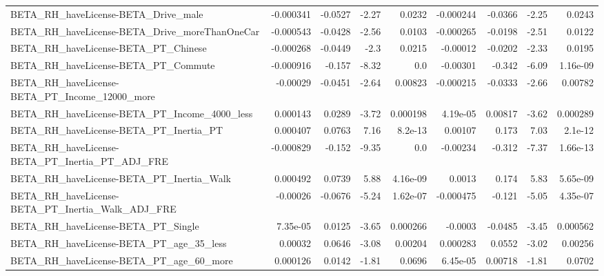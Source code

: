 \begin{tabular}{lrrrrrrrr}
BETA\_RH\_haveLicense-BETA\_Drive\_male                &   -0.000341 &      -0.0527 &    -2.27 &   0.0232 &  -0.000244 &     -0.0366 &        -2.25 &        0.0243 \\
BETA\_RH\_haveLicense-BETA\_Drive\_moreThanOneCar      &   -0.000543 &      -0.0428 &    -2.56 &   0.0103 &  -0.000265 &     -0.0198 &        -2.51 &        0.0122 \\
BETA\_RH\_haveLicense-BETA\_PT\_Chinese                &   -0.000268 &      -0.0449 &     -2.3 &   0.0215 &   -0.00012 &     -0.0202 &        -2.33 &        0.0195 \\
BETA\_RH\_haveLicense-BETA\_PT\_Commute                &   -0.000916 &       -0.157 &    -8.32 &      0.0 &   -0.00301 &      -0.342 &        -6.09 &      1.16e-09 \\
BETA\_RH\_haveLicense-BETA\_PT\_Income\_12000\_more      &    -0.00029 &      -0.0451 &    -2.64 &  0.00823 &  -0.000215 &     -0.0333 &        -2.66 &       0.00782 \\
BETA\_RH\_haveLicense-BETA\_PT\_Income\_4000\_less       &    0.000143 &       0.0289 &    -3.72 & 0.000198 &   4.19e-05 &     0.00817 &        -3.62 &      0.000289 \\
BETA\_RH\_haveLicense-BETA\_PT\_Inertia\_PT             &    0.000407 &       0.0763 &     7.16 &  8.2e-13 &    0.00107 &       0.173 &         7.03 &       2.1e-12 \\
BETA\_RH\_haveLicense-BETA\_PT\_Inertia\_PT\_ADJ\_FRE     &   -0.000829 &       -0.152 &    -9.35 &      0.0 &   -0.00234 &      -0.312 &        -7.37 &      1.66e-13 \\
BETA\_RH\_haveLicense-BETA\_PT\_Inertia\_Walk           &    0.000492 &       0.0739 &     5.88 & 4.16e-09 &     0.0013 &       0.174 &         5.83 &      5.65e-09 \\
BETA\_RH\_haveLicense-BETA\_PT\_Inertia\_Walk\_ADJ\_FRE   &    -0.00026 &      -0.0676 &    -5.24 & 1.62e-07 &  -0.000475 &      -0.121 &        -5.05 &      4.35e-07 \\
BETA\_RH\_haveLicense-BETA\_PT\_Single                 &    7.35e-05 &       0.0125 &    -3.65 & 0.000266 &    -0.0003 &     -0.0485 &        -3.45 &      0.000562 \\
BETA\_RH\_haveLicense-BETA\_PT\_age\_35\_less            &     0.00032 &       0.0646 &    -3.08 &  0.00204 &   0.000283 &      0.0552 &        -3.02 &       0.00256 \\
BETA\_RH\_haveLicense-BETA\_PT\_age\_60\_more            &    0.000126 &       0.0142 &    -1.81 &   0.0696 &   6.45e-05 &     0.00718 &        -1.81 &        0.0702 \\

\end{tabular}
